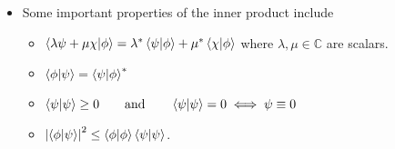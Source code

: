 \documentclass[11pt, a4paper]{article}
\newcommand{\eqtext}[1]{\qquad \text{#1} \qquad}
\newcommand{\p}{\psi}  %
\begin{document}
\begin{itemize}
    \item Some important properties of the inner product include
    \begin{itemize}
        \item $ \braket{\lambda \psi + \mu \chi}{\phi} = \lambda^{*} \braket{\psi}{\phi} + \mu^{*} \braket{\chi}{\phi}$ where $ \lambda, \mu \in \mathbb{C} $ are scalars.

        \item $ \braket{\phi}{\psi} = \braket{\psi}{\phi}^{*} $

        \item $ \braket{\psi}{\psi} \geq 0 \eqtext{and} \braket{\psi}{\psi} = 0 \iff \psi \equiv 0 $

        \item $ \abs{\braket{\phi}{\psi}}^{2} \leq \braket{\phi}{\phi}\braket{\p}{\p} $.
    \end{itemize}
	

\end{itemize}
\end{document}
